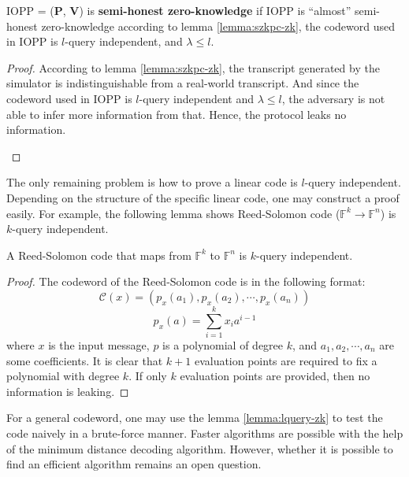 \begin{lemma}
\label{lemma:szkpc-zk-final}

IOPP = ($\textbf{P}$, $\textbf{V}$) is \textbf{semi-honest zero-knowledge} if IOPP is ``almost'' semi-honest zero-knowledge according to lemma \ref{lemma:szkpc-zk}, the codeword used in IOPP is $l$-query independent, and $\lambda \le l$.

\end{lemma}
\begin{proof}

According to lemma \ref{lemma:szkpc-zk}, the transcript generated by the simulator is indistinguishable from a real-world transcript. And since the codeword used in IOPP is $l$-query independent and $\lambda \le l$, the adversary is not able to infer more information from that. Hence, the protocol leaks no information.

\qedsymbol{}
$ $
\end{proof}

The only remaining problem is how to prove a linear code is $l$-query independent. Depending on the structure of the specific linear code, one may construct a proof easily. For example, the following lemma shows Reed-Solomon code ($\mathbb{F}^k \rightarrow \mathbb{F}^n$) is $k$-query independent.

\begin{lemma}
\label{lemma:rscode-kzk}

A Reed-Solomon code that maps from $\mathbb{F}^k$ to $\mathbb{F}^n$ is $k$-query independent.

\end{lemma}
\begin{proof}

The codeword of the Reed-Solomon code is in the following format:
$$
\mathcal{C}(x) = 
(
p_x(a_1), p_x(a_2), \cdots, p_x(a_n)
)
$$
$$
p_x(a) = \sum_{i=1}^k x_i a^{i-1}
$$
where $x$ is the input message, $p$ is a polynomial of degree $k$, and $a_1, a_2, \cdots, a_n$ are some coefficients.
It is clear that $k+1$ evaluation points are required to fix a polynomial with degree $k$. If only $k$ evaluation points are provided, then no information is leaking.
\qedsymbol{}
\end{proof}

For a general codeword, one may use the lemma \ref{lemma:lquery-zk} to test the code naively in a brute-force manner. Faster algorithms are possible with the help of the minimum distance decoding algorithm. However, whether it is possible to find an efficient algorithm remains an open question.